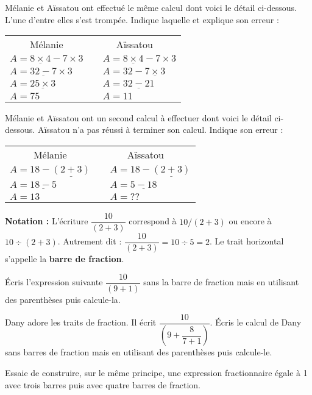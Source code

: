 \begin{activite}
 \begin{partie}
Mélanie et Aïssatou ont effectué le même calcul dont voici le détail ci-dessous. L'une d'entre elles s'est trompée. Indique laquelle et explique son erreur :
\vspace{1em}
\begin{center}
 \begin{tabularx}{.6\linewidth}{X|cX}
  \multicolumn{1}{c|}{Mélanie} & \multicolumn{2}{c}{Aïssatou} \\
  $A = \underline{8 \times 4} - 7 \times 3$ && $A = \underline{8 \times 4} - 7 \times 3$ \\
  $A = \underline{32 - 7} \times 3$ && $A = 32 - \underline{7 \times 3}$ \\
  $A = \underline{25 \times 3}$ && $A = \underline{32 - 21}$ \\
  $A = 75$ && $A = 11$ \\
  \end{tabularx}
\end{center}
\end{partie}
\begin{partie}
Mélanie et Aïssatou ont un second calcul à effectuer dont voici le détail ci-dessous. Aïssatou n'a pas réussi à terminer son calcul. Indique son erreur :
\vspace{1em}
\begin{center}
 \begin{tabularx}{.6\linewidth}{X|cX}
  \multicolumn{1}{c|}{Mélanie} & \multicolumn{2}{c}{Aïssatou} \\
  $A = 18 - \underline{(2 + 3)}$ && $A = 18 - \underline{(2 + 3)}$ \\
  $A = \underline{18 - 5}$ && $A = \underline{5 - 18}$ \\
  $A = 13$ && $A = ??$ \\
  \end{tabularx}
\end{center}
\end{partie}
\end{activite}
\begin{activite}
\textbf{Notation :}
L’écriture $\dfrac{10}{(2 + 3)}$ correspond à $10 / (2 + 3)$ ou encore à $10 \div (2 + 3)$.
Autrement dit : $\dfrac{10}{(2 + 3)} = 10 \div 5 = 2$. Le trait horizontal s'appelle la \textbf{barre de fraction}.
\begin{partie}
Écris l'expression suivante $\dfrac{10}{(9 + 1)}$ sans la barre de fraction mais en utilisant des parenthèses puis calcule-la.\dotfill
\end{partie}
\begin{partie}
Dany adore les traits de fraction. Il écrit $\dfrac{10}{\left(9 + \dfrac{8}{7+1}\right)}$. Écris le calcul de Dany sans barres de fraction mais en utilisant des parenthèses puis calcule-le. \dotfill
\dotfill
\end{partie}
\begin{partie}
Essaie de construire, sur le même principe, une expression fractionnaire égale à 1 avec trois barres puis avec quatre barres de fraction.
\end{partie}
\end{activite}
